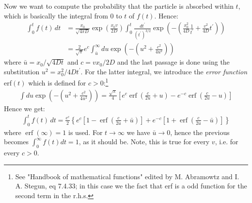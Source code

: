 \documentclass[4apaper,11pt,fleqn]{article}
\theoremstyle{remark}
\theoremstyle{definition}
\begin{document}
Now we want to compute the probability that the particle is absorbed within $t$, which is basically the integral from 0 to $t$ of $f(t)$. Hence:
\begin{align*}
  \int_0^t f(t) \, dt &= \frac{x_{0}}{\sqrt{4 \pi D}} \exp \left(\frac{x_{0} v}{2 D}\right) \int_{0}^{t} \frac{d t^{\prime}}{\left(t^{\prime}\right)^{3 / 2}} \exp \left(-\left(\frac{x_{0}^{2}}{4 D} \frac{1}{t^{\prime}}+\frac{v^{2}}{4 D} t^{\prime}\right)\right) \\
                      &= \frac{2}{\sqrt{\pi}} e^{c} \int_{\bar{u}}^{\infty} d u \exp \left(-\left(u^{2}+\frac{c^{2}}{4 u^{2}}\right)\right)
\end{align*}
where $\bar{u} = x_0/\sqrt{4Dt}$ and $c= v x_0/2D$ and the last passage is done using the substitution $u^2=x_0^2/4Dt^'$.
For the latter integral, we introduce the \emph{error function} erf$(t)$ which is defined for $c>0$:\footnote{See "Handbook of mathematical functions" edited by M. Abramowtz and I. A. Stegun, eq 7.4.33; in this case we the fact that erf is a odd function for the second term in the r.h.s.}
\begin{align*}
  \int d u \exp \left(-\left(u^{2}+\frac{c^{2}}{4 u^{2}}\right)\right)=\frac{\sqrt{\pi}}{4}\left[e^{c} \operatorname{erf}\left(\frac{c}{2 u}+u\right)-e^{-c} \operatorname{erf}\left(\frac{c}{2 u}-u\right)\right]
\end{align*}
Hence we get:
\begin{align}
  \label{eq:erf}
  \int_0^t f(t) \, dt =  \frac{e^{c}}{2}\left\{e^{c}\left[1-\operatorname{erf}\left(\frac{c}{2 \bar{u}}+\bar{u}\right)\right]+e^{-c}\left[1+\operatorname{erf}\left(\frac{c}{2 \bar{u}}-\bar{u}\right)\right]\right\}
\end{align}
where $\operatorname{erf}(\infty)=1$ is used.
For $t \rightarrow \infty$ we have $\bar{u} \rightarrow 0$, hence the previous becomes $\int_0^\infty f(t) dt = 1$, as it should be. Note, this is true for every $v$, i.e. for every $c>0$.
\end{document}
